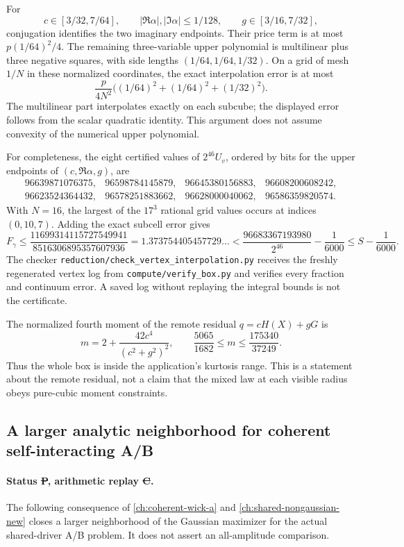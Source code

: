 For
\[
 c\in[3/32,7/64],\qquad
 |\Re\alpha|,|\Im\alpha|\le1/128,\qquad
 g\in[3/16,7/32],
\]
conjugation identifies the two imaginary endpoints. Their price term is
at most $p(1/64)^2/4$. The remaining three-variable upper polynomial
is multilinear plus three negative squares, with side lengths
$(1/64,1/64,1/32)$. On a grid of mesh $1/N$ in these normalized
coordinates, the exact interpolation error is at most
\[
 \frac{p}{4N^2}\bigl((1/64)^2+(1/64)^2+(1/32)^2\bigr).
\]
The multilinear part interpolates exactly on each subcube; the displayed
error follows from the scalar quadratic identity. This argument does
not assume convexity of the numerical upper polynomial.

For completeness, the eight certified values of $2^{46}U_v$, ordered by
bits for the upper endpoints of $(c,\Re\alpha,g)$, are
\[
\begin{array}{rrrr}
96639871076375,&96598784145879,&96645380156883,&96608200608242,\\
96623524364432,&96578251883662,&96628000040062,&96586359820574.
\end{array}
\]
With $N=16$, the largest of the $17^3$ rational grid values occurs
at indices $(0,10,7)$. Adding the exact subcell error gives
\[
 F_\gamma\le
 \frac{11699314115727549941}{8516306895357607936}
 =1.373754405457729\ldots
 <\frac{96683367193980}{2^{46}}-\frac1{6000}
 \le S-\frac1{6000}.
\]
The checker \texttt{reduction/check\_vertex\_interpolation.py} receives
the freshly regenerated vertex log from \texttt{compute/verify\_box.py}
and verifies every fraction and continuum error. A saved log without
replaying the integral bounds is not the certificate.

The normalized fourth moment of the remote residual $q=cH(X)+gG$ is
\[
 m=2+\frac{42c^4}{(c^2+g^2)^2},\qquad
 \frac{5065}{1682}\le m\le\frac{175340}{37249}.
\]
Thus the whole box is inside the application's kurtosis range.
This is a statement about the remote residual, not a claim that the
mixed law at each visible radius obeys pure-cubic moment constraints.


\subsection{A larger analytic neighborhood for coherent self-interacting A/B}
\label{sec:local-wick-ab-new}
\paragraph{Status \st{P}, arithmetic replay \st{C}.}
The following consequence of \autoref{ch:coherent-wick-a} and
\autoref{ch:shared-nongaussian-new} closes a larger neighborhood of the
Gaussian maximizer for the actual shared-driver A/B problem. It does not
assert an all-amplitude comparison.

